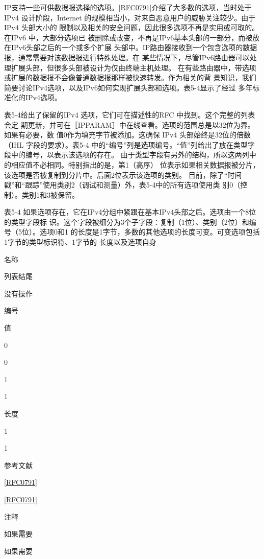 IP支持一些可供数据报选择的选项。\href{https://www.rfc-editor.org/rfc/rfc0791}{[RFC0791]}介绍了大多数的选项，当时处于IPv4
设计阶段，Internet 的规模相当小，对来自恶意用户的威胁关注较少。由于 IPv4 头部大小的
限制以及相关的安全问题，因此很多选项不再是实用或可取的。在IPv6 中，大部分选项已
被删除或改变，不再是IPv6基本头部的一部分，而被放在IPv6头部之后的一个或多个扩展
头部中。IP路由器接收到一个包含选项的数据报，通常需要对该数据报进行特殊处理。在
某些情况下，尽管IPv6路由器可以处理扩展头部，但很多头部被设计为仅由终端主机处理。
在有些路由器中，带选项或扩展的数据报不会像普通数据报那样被快速转发。作为相关的背
景知识，我们简要讨论IPv4选项，以及IPv6如何实现扩展头部和选项。表5-4显示了经过
多年标准化的IPv4选项。

表5-4给出了保留的IPv4 选项，它们可在描述性的RFC 中找到。这个完整的列表会定
期更新，并可在［IPPARAM］中在线查看。选项的范围总是以32位为界。如果有必要，数
值0作为填充字节被添加。这确保 IPv4 头部始终是32位的倍数（IHL 字段的要求）。表5-4
中的“编号”列是选项编号。“值”列给出了放在类型字段中的编号，以表示该选项的存在。
由于类型字段有另外的结构，所以这两列中的相应值不必相同。特别指出的是，第1（高序）
位表示如果相关数据报被分片，该选项是否被复制到分片中。后面2位表示该选项的类别。
目前，除了“时间戳”和“跟踪”使用类别2（调试和测量）外，表5-4中的所有选项使用类
别0（控制）。类别1和3被保留。

表5-4 如果选项存在，它在IPv4分组中紧跟在基本IPv4头部之后。选项由一个8位的类型字段标
识。这个字段被细分为3个子字段：复制（1位）、类别（2位）和编号（5位）。选项0和1
的长度是1字节，多数的其他选项的长度可变。可变选项包括1字节的类型标识符、1字节的
长度以及选项自身

名称

列表结尾

没有操作

编号

值

0

0

1

1

长度

1

1

参考文献

\href{https://www.rfc-editor.org/rfc/rfc0791}{[RFC0791]}

\href{https://www.rfc-editor.org/rfc/rfc0791}{[RFC0791]}

注释

如果需要

如果需要

